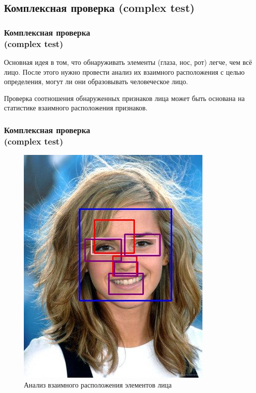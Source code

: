 \documentclass{beamer}
\begin{document}
\subsection{Комплексная проверка (complex test)}

\begin{frame}
\frametitle{Комплексная проверка\\(complex test)}

Основная идея в том, что обнаруживать элементы (глаза, нос, рот) легче, чем всё лицо. После этого нужно провести анализ их взаимного расположения с целью определения, могут ли они образовывать человеческое лицо.
\bigskip

Проверка соотношения обнаруженных признаков лица может быть основана на статистике взаимного расположения признаков.

\end{frame}
\begin{frame}
\frametitle{Комплексная проверка\\(complex test)}

\begin{figure}
\includegraphics[scale=0.55]{res/img03}
\caption{Анализ взаимного расположения элементов лица}
\end{figure}

\end{frame}
\end{document}
